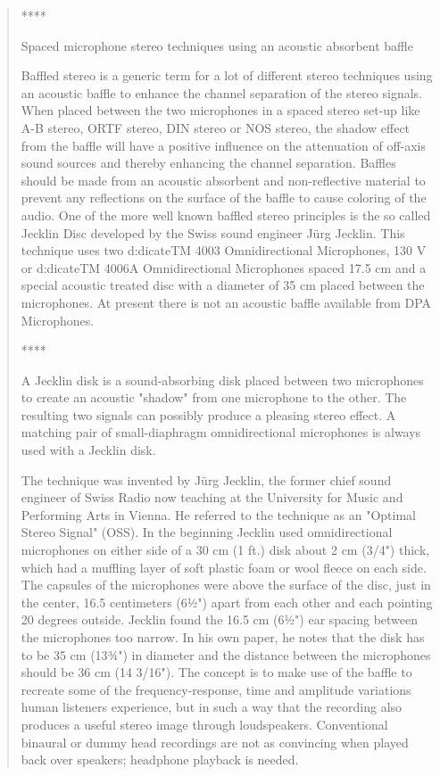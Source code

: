 \documentclass[a4paper,11pt]{article}
\begin{document}
\begin{quotation}
****

Spaced microphone stereo techniques using an acoustic absorbent baffle

Baffled stereo is a generic term for a lot of different stereo
techniques using an acoustic baffle to enhance the channel separation
of the stereo signals. When placed between the two microphones in a
spaced stereo set-up like A-B stereo, ORTF stereo, DIN stereo or NOS
stereo, the shadow effect from the baffle will have a positive
influence on the attenuation of off-axis sound sources and thereby
enhancing the channel separation. Baffles should be made from an
acoustic absorbent and non-reflective material to prevent any
reflections on the surface of the baffle to cause coloring of the
audio. One of the more well known baffled stereo principles is the so
called Jecklin Disc developed by the Swiss sound engineer Jürg
Jecklin. This technique uses two d:dicateTM 4003 Omnidirectional
Microphones, 130 V or d:dicateTM 4006A Omnidirectional Microphones
spaced 17.5 cm and a special acoustic treated disc with a diameter of
35 cm placed between the microphones. At present there is not an
acoustic baffle available from DPA Microphones.

****

A Jecklin disk is a sound-absorbing disk placed between two
microphones to create an acoustic "shadow" from one microphone to
the other. The resulting two signals can possibly produce a pleasing
stereo effect. A matching pair of small-diaphragm omnidirectional
microphones is always used with a Jecklin disk.

The technique was invented by Jürg Jecklin, the former chief sound
engineer of Swiss Radio now teaching at the University for Music and
Performing Arts in Vienna. He referred to the technique as an
"Optimal Stereo Signal" (OSS). In the beginning Jecklin used
omnidirectional microphones on either side of a 30 cm (1 ft.) disk
about 2 cm (3/4") thick, which had a muffling layer of soft plastic
foam or wool fleece on each side. The capsules of the microphones were
above the surface of the disc, just in the center, 16.5 centimeters
(6½") apart from each other and each pointing 20 degrees outside.
Jecklin found the 16.5 cm (6½") ear spacing between the microphones
too narrow. In his own paper, he notes that the disk has to be 35 cm
(13¾") in diameter and the distance between the microphones should be
36 cm (14 3/16"). The concept is to make use of the baffle to
recreate some of the frequency-response, time and amplitude variations
human listeners experience, but in such a way that the recording also
produces a useful stereo image through loudspeakers. Conventional
binaural or dummy head recordings are not as convincing when played
back over speakers; headphone playback is needed.


\end{quotation}
\end{document}
